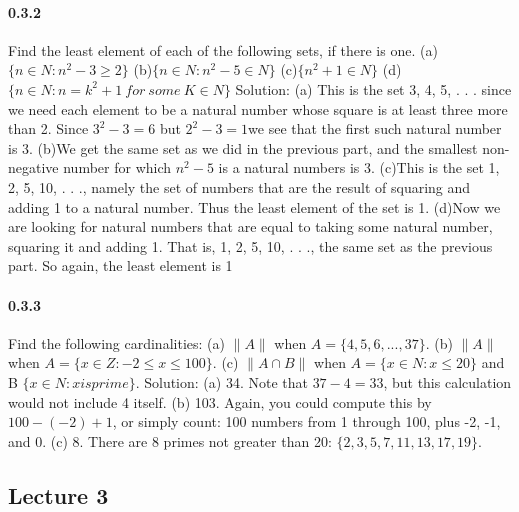 \documentclass{article}
\begin{document}
\paragraph{0.3.2}
Find the least element of each of the following sets, if there is one.\newline
(a)$\{n\in N:n^2-3\ge 2\}$\newline
(b)$\{n\in N:n^2-5\in N\}$\newline
(c)$\{n^2+1\in N\}$\newline
(d)$\{n\in N:n=k^2+1 \ for\ some \ K\in N\}$\newline
Solution:\newline
(a) This is the set {3, 4, 5, . . .} since we need each element to be a natural number whose square is at least three more than 2. Since $3^2-3=6$ but $2^2-3=1$we see that the first such natural number is 3.\newline
(b)We get the same set as we did in the previous part, and the smallest
non-negative number for which $n^2-5$ is a natural numbers is 3.\newline
(c)This is the set {1, 2, 5, 10, . . .}, namely the set of numbers that are
the result of squaring and adding 1 to a natural number. Thus the least element of the set is 1.\newline
(d)Now we are looking for natural numbers that are equal to taking some natural number, squaring it and adding 1. That is,
{1, 2, 5, 10, . . .}, the same set as the previous part. So again, the least
element is 1
\paragraph{0.3.3}
Find the following cardinalities:\newline
(a) $\|A\|$ when $A=\{4, 5, 6, . . . , 37\}$.\newline
(b) $\|A\|$ when $A=\{x\in Z : -2 \leq x \leq 100\}$.\newline
(c) $\|A \cap B\|$ when $A=\{x\in N : x \leq 20\}$ and B  $\{x\in N : x is prime\}$.\newline
Solution:\newline
(a) 34. Note that $37-4=33$, but this calculation would not include 4
itself.\newline
(b) 103. Again, you could compute this by $100 - (-2) + 1$, or simply
count: 100 numbers from 1 through 100, plus -2, -1, and 0.\newline
(c) 8. There are 8 primes not greater than 20: $\{2, 3, 5, 7, 11, 13, 17, 19\}$.
\subsection{Lecture 3}
\end{document}
